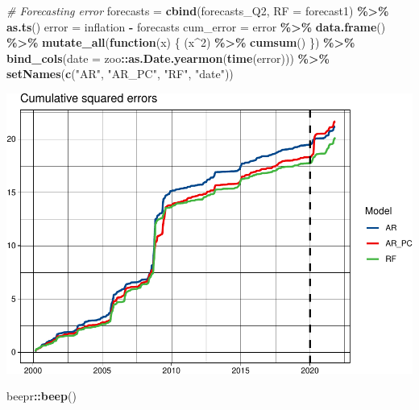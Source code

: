 \documentclass[
]{article}
\newenvironment{Shaded}{\begin{snugshade}}{\end{snugshade}}
\newcommand{\AttributeTok}[1]{\textcolor[rgb]{0.13,0.29,0.53}{#1}}
\newcommand{\CommentTok}[1]{\textcolor[rgb]{0.56,0.35,0.01}{\textit{#1}}}
\newcommand{\ControlFlowTok}[1]{\textcolor[rgb]{0.13,0.29,0.53}{\textbf{#1}}}
\newcommand{\DecValTok}[1]{\textcolor[rgb]{0.00,0.00,0.81}{#1}}
\newcommand{\FunctionTok}[1]{\textcolor[rgb]{0.13,0.29,0.53}{\textbf{#1}}}
\newcommand{\NormalTok}[1]{#1}
\newcommand{\OtherTok}[1]{\textcolor[rgb]{0.56,0.35,0.01}{#1}}
\newcommand{\SpecialCharTok}[1]{\textcolor[rgb]{0.81,0.36,0.00}{\textbf{#1}}}
\newcommand{\StringTok}[1]{\textcolor[rgb]{0.31,0.60,0.02}{#1}}
\begin{document}
\begin{Shaded}
\begin{Highlighting}[]
\CommentTok{\# Forecasting error}
\NormalTok{forecasts }\OtherTok{=} \FunctionTok{cbind}\NormalTok{(forecasts\_Q2, }\AttributeTok{RF =}\NormalTok{ forecast1) }\SpecialCharTok{\%\textgreater{}\%}
    \FunctionTok{as.ts}\NormalTok{()}
\NormalTok{error }\OtherTok{=}\NormalTok{ inflation }\SpecialCharTok{{-}}\NormalTok{ forecasts}
\NormalTok{cum\_error }\OtherTok{=}\NormalTok{ error }\SpecialCharTok{\%\textgreater{}\%}
    \FunctionTok{data.frame}\NormalTok{() }\SpecialCharTok{\%\textgreater{}\%}
    \FunctionTok{mutate\_all}\NormalTok{(}\ControlFlowTok{function}\NormalTok{(x) \{}
\NormalTok{        (x}\SpecialCharTok{\^{}}\DecValTok{2}\NormalTok{) }\SpecialCharTok{\%\textgreater{}\%}
            \FunctionTok{cumsum}\NormalTok{()}
\NormalTok{    \}) }\SpecialCharTok{\%\textgreater{}\%}
    \FunctionTok{bind\_cols}\NormalTok{(}\AttributeTok{date =}\NormalTok{ zoo}\SpecialCharTok{::}\FunctionTok{as.Date.yearmon}\NormalTok{(}\FunctionTok{time}\NormalTok{(error))) }\SpecialCharTok{\%\textgreater{}\%}
    \FunctionTok{setNames}\NormalTok{(}\FunctionTok{c}\NormalTok{(}\StringTok{"AR"}\NormalTok{, }\StringTok{"AR\_PC"}\NormalTok{, }\StringTok{"RF"}\NormalTok{, }\StringTok{"date"}\NormalTok{))}
\end{Highlighting}
\end{Shaded}

\includegraphics{Trabalho_Econo4_Q3_files/figure-latex/unnamed-chunk-7-1.pdf}

\begin{Shaded}
\begin{Highlighting}[]
\NormalTok{beepr}\SpecialCharTok{::}\FunctionTok{beep}\NormalTok{()}
\end{Highlighting}
\end{Shaded}
\end{document}
